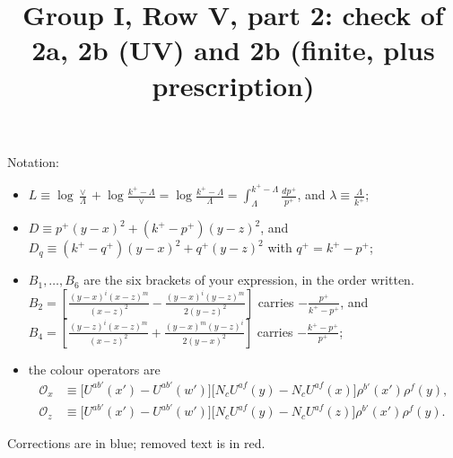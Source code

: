 \documentclass[10pt]{article}
\title{Group I, Row V, part 2: check of 2a, 2b (UV) and 2b (finite, plus prescription)}
\date{}
\numberwithin{equation}{section}
\newcommand{\BB}{\left[\frac{(y-x)^{i}(x-z)^{m}}{(x-z)^{2}}-\frac{(y-x)^{i}(y-z)^{m}}{2(y-z)^{2}}\right]}
\newcommand{\BF}{\left[\frac{(y-z)^{i}(x-z)^{m}}{(x-z)^{2}}+\frac{(y-x)^{m}(y-z)^{i}}{2(y-x)^{2}}\right]}
\newcommand{\Ox}{\mathcal O_x}
\newcommand{\Oz}{\mathcal O_z}
\begin{document}
\maketitle
Notation:
\begin{itemize}
\item $L\equiv\log\frac{\vee}{\Lambda}+\log\frac{k^+-\Lambda}{\vee}=\log\frac{k^+-\Lambda}{\Lambda}=\int_\Lambda^{k^+-\Lambda}\frac{dp^+}{p^+}$, and $\lambda\equiv\frac{\Lambda}{k^+}$;
\item $D\equiv p^+(y-x)^2+(k^+-p^+)(y-z)^2$, and $D_q\equiv(k^+-q^+)(y-x)^2+q^+(y-z)^2$ with $q^+=k^+-p^+$;
\item $B_1,\dots,B_6$ are the six brackets of your expression, in the order written. $B_2=\BB$ carries $-\frac{p^+}{k^+-p^+}$, and $B_4=\BF$ carries $-\frac{k^+-p^+}{p^+}$;
\item the colour operators are
\begin{align*}
\Ox&\equiv\big[U^{ab'}(x')-U^{ab'}(w')\big]\big[N_cU^{af}(y)-N_cU^{af}(x)\big]\rho^{b'}(x')\rho^f(y),\\
\Oz&\equiv\big[U^{ab'}(x')-U^{ab'}(w')\big]\big[N_cU^{af}(y)-N_cU^{af}(z)\big]\rho^{b'}(x')\rho^f(y).
\end{align*}
\end{itemize}
Corrections are in blue; removed text is in red.

\end{document}
